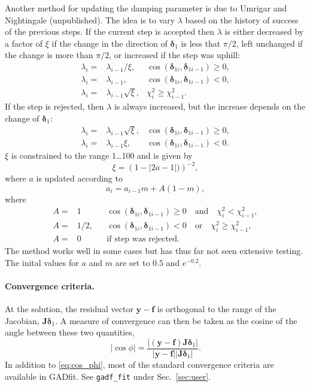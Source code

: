 \documentclass{article}
\begin{document}
Another method for updating the damping parameter is due to Umrigar
and Nightingale (unpublished). The idea is to vary $\lambda$ based on
the history of success of the previous steps. If the current step is
accepted then $\lambda$ is either decreased by a factor of $\xi$ if
the change in the direction of $\bm\delta_1$ is less that $\pi/2$,
left unchanged if the change is more than $\pi/2$, or increased if the
step was uphill:
\begin{align}
  \label{eq:umnigh_lambda_acc}
  \lambda_i =& \lambda_{i-1}/\xi, 
  & \cos(\bm\delta_{1i},\bm\delta_{1i-1}) \ge 0, \\
  \lambda_i =& \lambda_{i-1}, & \cos(\bm\delta_{1i},\bm\delta_{1i-1})
                                < 0, \\
  \lambda_i =& \lambda_{i-1}\sqrt{\xi}, & \chi_i^2 \ge \chi_{i-1}^2.
\end{align}
If the step is rejected, then $\lambda$ is always increased, but the
increase depends on the change of $\bm\delta_1$:
\begin{align}
  \label{eq:umnigh_lambda_rej}
  \lambda_i =& \lambda_{i-1}\sqrt{\xi}, 
  & \cos(\bm\delta_{1i},\bm\delta_{1i-1}) \ge 0, \\
  \lambda_i =& \lambda_{i-1}\xi, & \cos(\bm\delta_{1i},\bm\delta_{1i-1})
                                   < 0.
\end{align}
$\xi$ is constrained to the range 1\ldots100 and is given by
\begin{equation}
  \label{eq:umnigh_xi}
  \xi = \left( 1-|2a-1|) \right)^{-2},
\end{equation}
where $a$ is updated according to
\begin{equation}
  \label{eq:umnigh_a_update}
  a_i = a_{i-1}m + A(1-m),
\end{equation}
where
\begin{align}
  \label{eq:umnigh_A_update}
  A =& 1 && \cos(\bm\delta_{1i},\bm\delta_{1i-1}) \ge 0 \quad
            \text{and} \quad \chi_i^2 < \chi_{i-1}^2, \\
  A =& 1/2, && \cos(\bm\delta_{1i},\bm\delta_{1i-1})
               < 0 \quad \text{or} \quad \chi_i^2 \ge \chi_{i-1}^2, \\
  A =& 0 && \text{if step was rejected}.
\end{align}
The method works well in some cases but has thus far not seen
extensive testing. The inital values for $a$ and $m$ are set to $0.5$
and $e^{-0.2}$.

\paragraph{Convergence criteria.} At the solution, the residual vector
$\bm y - \bm f$ is orthogonal to the range of the Jacobian,
$\bm J\bm\delta_1$. A measure of convergence can then be taken as the
cosine of the angle between these two quantities,
\begin{equation}
  \label{eq:cos_phi}
  |\cos\phi| = \frac{|(\bm y - \bm f) \bm J\bm \delta_1|}{|\bm y - \bm
    f||\bm J\bm \delta_1|}.
\end{equation}
In addition to \eqref{eq:cos_phi}, most of the standard convergence
criteria are available in GADfit. See \verb+gadf_fit+ under
Sec.~\ref{sec:user}.
\end{document}
